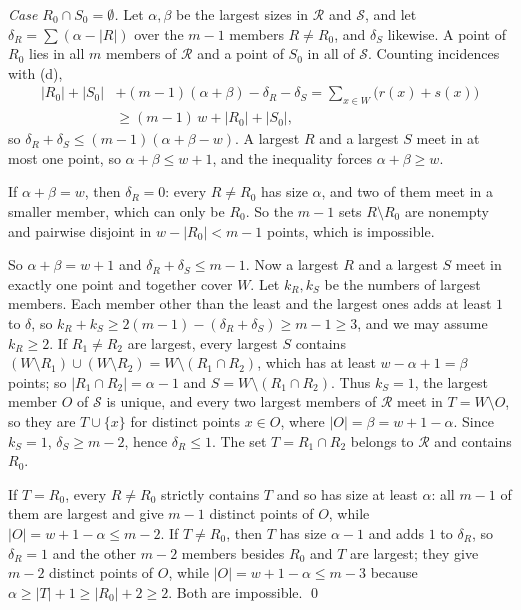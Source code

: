 \documentclass[aps,prd,twocolumn,superscriptaddress,nofootinbib,longbibliography,floatfix,amsmath,amssymb,10pt]{revtex4-2}
\theoremstyle{plain}
\theoremstyle{definition}
\theoremstyle{plain}
\begin{document}
\emph{Case $R_0\cap S_0=\emptyset$.} Let $\alpha,\beta$ be the largest sizes in $\mathcal R$ and $\mathcal S$, and let $\delta_R=\sum(\alpha-|R|)$ over the $m-1$ members $R\neq R_0$, and $\delta_S$ likewise. A point of $R_0$ lies in all $m$ members of $\mathcal R$ and a point of $S_0$ in all of $\mathcal S$. Counting incidences with (d),
\begin{align*}
|R_0|+|S_0|&+(m-1)(\alpha+\beta)-\delta_R-\delta_S=\sum_{x\in W}\bigl(r(x)+s(x)\bigr)\\
&\ge (m-1)\,w+|R_0|+|S_0|,
\end{align*}
so $\delta_R+\delta_S\le(m-1)(\alpha+\beta-w)$. A largest $R$ and a largest $S$ meet in at most one point, so $\alpha+\beta\le w+1$, and the inequality forces $\alpha+\beta\ge w$.

If $\alpha+\beta=w$, then $\delta_R=0$: every $R\neq R_0$ has size $\alpha$, and two of them meet in a smaller member, which can only be $R_0$. So the $m-1$ sets $R\setminus R_0$ are nonempty and pairwise disjoint in $w-|R_0|<m-1$ points, which is impossible.

So $\alpha+\beta=w+1$ and $\delta_R+\delta_S\le m-1$. Now a largest $R$ and a largest $S$ meet in exactly one point and together cover $W$. Let $k_R,k_S$ be the numbers of largest members. Each member other than the least and the largest ones adds at least $1$ to $\delta$, so $k_R+k_S\ge 2(m-1)-(\delta_R+\delta_S)\ge m-1\ge3$, and we may assume $k_R\ge2$. If $R_1\ne R_2$ are largest, every largest $S$ contains $(W\setminus R_1)\cup(W\setminus R_2)=W\setminus(R_1\cap R_2)$, which has at least $w-\alpha+1=\beta$ points; so $|R_1\cap R_2|=\alpha-1$ and $S=W\setminus(R_1\cap R_2)$. Thus $k_S=1$, the largest member $O$ of $\mathcal S$ is unique, and every two largest members of $\mathcal R$ meet in $T=W\setminus O$, so they are $T\cup\{x\}$ for distinct points $x\in O$, where $|O|=\beta=w+1-\alpha$. Since $k_S=1$, $\delta_S\ge m-2$, hence $\delta_R\le1$. The set $T=R_1\cap R_2$ belongs to $\mathcal R$ and contains $R_0$.

If $T=R_0$, every $R\neq R_0$ strictly contains $T$ and so has size at least $\alpha$: all $m-1$ of them are largest and give $m-1$ distinct points of $O$, while $|O|=w+1-\alpha\le m-2$. If $T\ne R_0$, then $T$ has size $\alpha-1$ and adds $1$ to $\delta_R$, so $\delta_R=1$ and the other $m-2$ members besides $R_0$ and $T$ are largest; they give $m-2$ distinct points of $O$, while $|O|=w+1-\alpha\le m-3$ because $\alpha\ge|T|+1\ge|R_0|+2\ge2$. Both are impossible. \qed
\end{document}
